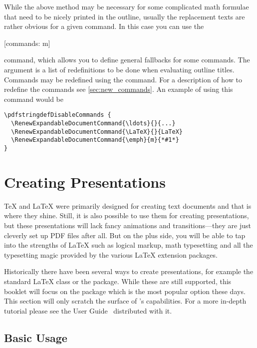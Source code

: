 While the above method may be necessary for some complicated math formulae
that need to be nicely printed in the outline, usually the replacement texts
are rather obvious for a given command. In this case you can use the
\begin{lscommand}
  [commands: m]
\end{lscommand}
command, which allows you to define general fallbacks for some commands. The
 argument is a list of redefinitions to be done when evaluating
outline titles. Commands may be redefined using the
 command. For a description of how to
redefine the commands see \autoref{sec:new_commands}. An example of using this
command would be
\begin{verbatim}
\pdfstringdefDisableCommands {
  \RenewExpandableDocumentCommand{\ldots}{}{...}
  \RenewExpandableDocumentCommand{\LaTeX}{}{LaTeX}
  \RenewExpandableDocumentCommand{\emph}{m}{*#1*}
}
\end{verbatim}

\section{Creating Presentations}\label{sec:beamer}
\begingroup
{}

\TeX{} and \LaTeX{} were primarily designed for creating text documents and
that is where they shine. Still, it is also possible to use them for creating
presentations, but these presentations will lack fancy animations and
transitions---they are just cleverly set up PDF files after all. But on the
plus side, you will be able to tap into the strengths of \LaTeX{} such as
logical markup, math typesetting and all the typesetting magic provided by the
various \LaTeX{} extension packages.

Historically there have been several ways to create presentations, for example
the standard \LaTeX{}  class or the  package. While
these are still supported, this booklet will focus on the  package
which is the most popular option these days. This section will only scratch the
surface of 's capabilities. For a more in-depth tutorial please see
the User Guide~\cite{pack:beamer} distributed with it.

\subsection{Basic Usage}

